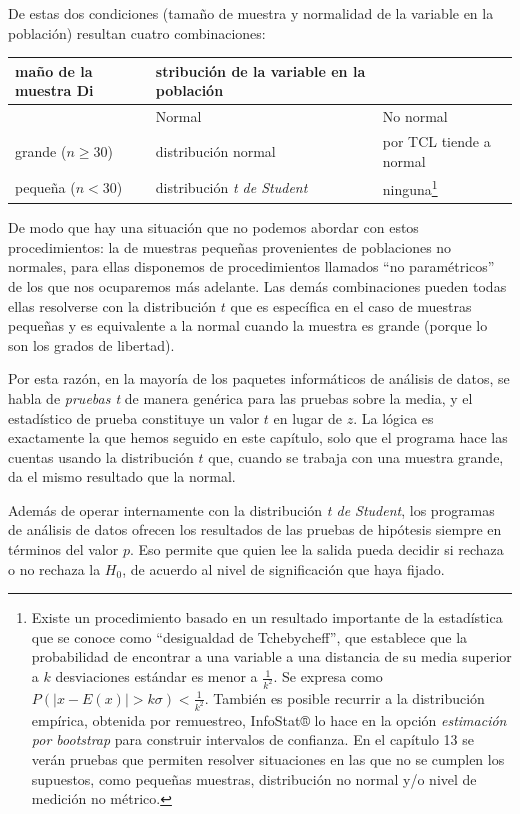 \documentclass[]{book}
\let\rmarkdownfootnote\footnote%
\def\footnote{\protect\rmarkdownfootnote}
\begin{document}
De estas dos condiciones (tamaño de muestra y normalidad de la variable
en la población) resultan cuatro combinaciones:

\begin{longtable}[]{@{}lll@{}}
\toprule
maño de la muestra Di & stribución de la variable en la población &\tabularnewline
\midrule
\endhead
& Normal & No normal\tabularnewline
grande (\(n \geq 30\)) & distribución normal & por TCL tiende a normal\tabularnewline
pequeña (\(n < 30\)) & distribución \emph{t de Student} & ninguna\footnote{Existe un procedimiento basado en un resultado importante de la estadística que se conoce como ``desigualdad de Tchebycheff'', que establece que la probabilidad de encontrar a una variable a una distancia de su media superior a \(k\) desviaciones estándar es menor a \(\frac{1}{k^{2}}\). Se expresa como \(P\left( \left| x - E(x) \right| > k\sigma \right) < \frac{1}{k^{2}}\). También es posible recurrir a la distribución empírica, obtenida por remuestreo, InfoStat® lo hace en la opción \emph{estimación por bootstrap} para construir intervalos de confianza. En el capítulo 13 se verán pruebas que permiten resolver situaciones en las que no se cumplen los supuestos, como pequeñas muestras, distribución no normal y/o nivel de medición no métrico.}\tabularnewline
\bottomrule
\end{longtable}

De modo que hay una situación que no podemos abordar con estos
procedimientos: la de muestras pequeñas provenientes de poblaciones no
normales, para ellas disponemos de procedimientos llamados ``no
paramétricos'' de los que nos ocuparemos más adelante. Las demás
combinaciones pueden todas ellas resolverse con la distribución \(t\) que
es específica en el caso de muestras pequeñas y es equivalente a la
normal cuando la muestra es grande (porque lo son los grados de
libertad).

Por esta razón, en la mayoría de los paquetes informáticos de análisis
de datos, se habla de \emph{pruebas t} de manera genérica para las pruebas
sobre la media, y el estadístico de prueba constituye un valor \(t\) en
lugar de \(z\). La lógica es exactamente la que hemos seguido en este
capítulo, solo que el programa hace las cuentas usando la distribución
\(t\) que, cuando se trabaja con una muestra grande, da el mismo resultado
que la normal.

Además de operar internamente con la distribución \emph{t de Student}, los
programas de análisis de datos ofrecen los resultados de las pruebas de
hipótesis siempre en términos del valor \(p\). Eso permite que quien lee
la salida pueda decidir si rechaza o no rechaza la \(H_{0}\), de acuerdo al
nivel de significación que haya fijado.
\end{document}
